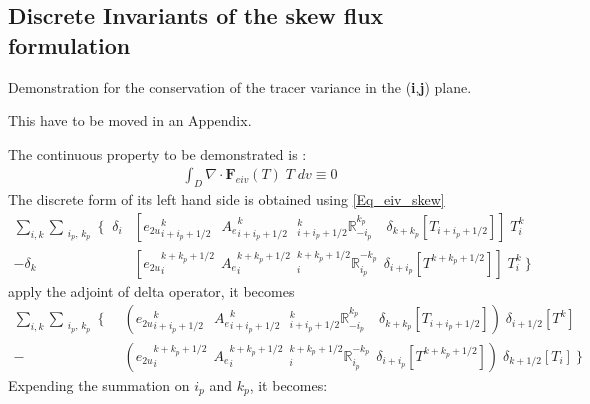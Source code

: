 \documentclass[NEMO_book]{subfiles}
\begin{document}
$\ $\newpage      %
\subsection{Discrete Invariants of the skew flux formulation}
\label{Apdx_eiv_skew}


Demonstration for the conservation of the tracer variance in the (\textbf{i},\textbf{j}) plane. 

This have to be moved in an Appendix.

The continuous property to be demonstrated is :
\begin{align*}
\int_D \nabla \cdot \textbf{F}_{eiv}(T) \; T \;dv  \equiv 0
\end{align*}
The discrete form of its left hand side is obtained using \eqref{Eq_eiv_skew}
\begin{align*}
 \sum\limits_{i,k} \sum_{\substack{i_p,\,k_p}}  \Biggl\{   \;\;
 \delta_i  &\left[                                                    
{e_{2u}}_{i+i_p+1/2}^{k}                                  \;\ \ {A_{e}}_{i+i_p+1/2}^{k} 
\ \ \ { _{i+i_p+1/2}^k \mathbb{R}_{-i_p}^{k_p} }   \quad \delta_{k+k_p}[T_{i+i_p+1/2}]         
   \right] \; T_i^k      \\
- \delta_k &\left[ 
{e_{2u}}_i^{k+k_p+1/2}                                     \ \ {A_{e}}_i^{k+k_p+1/2} 
\ \ { _i^{k+k_p+1/2} \mathbb{R}_{i_p}^{-k_p} }   \ \ \delta_{i+i_p}[T^{k+k_p+1/2}]   
   \right] \; T_i^k      \         \Biggr\}   
\end{align*}
apply the adjoint of delta operator, it becomes
\begin{align*}
 \sum\limits_{i,k} \sum_{\substack{i_p,\,k_p}}  \Biggl\{   \;\;
  &\left(                                                    
{e_{2u}}_{i+i_p+1/2}^{k}                                  \;\ \ {A_{e}}_{i+i_p+1/2}^{k} 
\ \ \ { _{i+i_p+1/2}^k \mathbb{R}_{-i_p}^{k_p} }   \quad \delta_{k+k_p}[T_{i+i_p+1/2}]         
   \right) \; \delta_{i+1/2}[T^{k}]      \\
- &\left( 
{e_{2u}}_i^{k+k_p+1/2}                                     \ \ {A_{e}}_i^{k+k_p+1/2} 
\ \ { _i^{k+k_p+1/2} \mathbb{R}_{i_p}^{-k_p} }   \ \ \delta_{i+i_p}[T^{k+k_p+1/2}]   
     \right) \; \delta_{k+1/2}[T_{i}]       \         \Biggr\}       
\end{align*}
Expending the summation on $i_p$ and $k_p$, it becomes:
\end{document}
